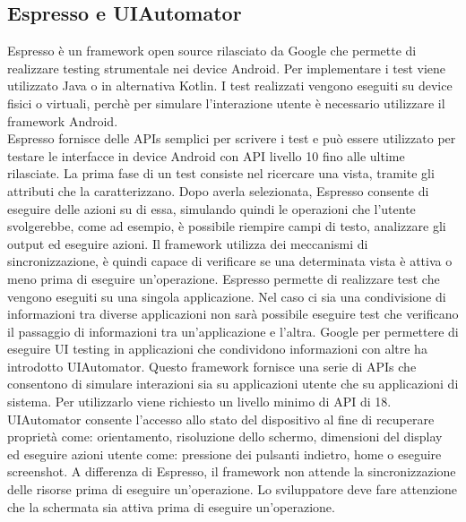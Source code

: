 \documentclass[12pt]{report}
\begin{document}
\subsection{Espresso e UIAutomator}
Espresso\cite{Espresso} è un framework open source rilasciato da Google che permette di realizzare testing strumentale nei device Android. Per implementare i test viene utilizzato Java o in alternativa Kotlin. I test realizzati vengono eseguiti su device fisici o virtuali, perchè per simulare l'interazione utente è necessario utilizzare il framework Android.\\
Espresso fornisce delle APIs semplici per scrivere i test e può essere utilizzato per testare le interfacce in device Android con API livello 10 fino alle ultime rilasciate.
La prima fase di un test consiste nel ricercare una vista, tramite gli attributi che la caratterizzano. Dopo averla selezionata, Espresso consente di eseguire delle azioni su di essa, simulando quindi le operazioni che l'utente svolgerebbe, come ad esempio, è possibile riempire campi di testo, analizzare gli output ed eseguire azioni. Il framework utilizza dei meccanismi di sincronizzazione, è quindi capace di verificare se una determinata vista è attiva o meno prima di eseguire un'operazione. Espresso permette di realizzare test che vengono eseguiti su una singola applicazione. Nel caso ci sia una condivisione di informazioni tra diverse applicazioni non sarà possibile eseguire test che verificano il passaggio di informazioni tra un'applicazione e l'altra. Google per permettere di eseguire UI testing in applicazioni che condividono informazioni con altre ha introdotto UIAutomator\cite{UIAutomator}. Questo framework fornisce una serie di APIs che consentono di simulare interazioni sia su applicazioni utente che su applicazioni di sistema. Per utilizzarlo viene richiesto un livello minimo di API di 18. UIAutomator consente l'accesso allo stato del dispositivo al fine di recuperare proprietà come: orientamento, risoluzione dello schermo, dimensioni del display ed eseguire azioni utente come: pressione dei pulsanti indietro, home o eseguire screenshot. A differenza di Espresso, il framework non attende la sincronizzazione delle risorse prima di eseguire un'operazione. Lo sviluppatore deve fare attenzione che la schermata sia attiva prima di eseguire un'operazione.
\end{document}
